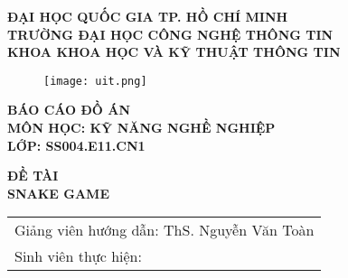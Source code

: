 \documentclass[a4paper, 12pt]{article}
\begin{document}

\thispagestyle{empty}
\begin{center}
    \begin{center}
        \textbf{ĐẠI HỌC QUỐC GIA TP. HỒ CHÍ MINH}\\[0.25cm]
        \large \textbf{TRƯỜNG ĐẠI HỌC CÔNG NGHỆ THÔNG TIN}\\[0.25cm]
        \large \textbf{KHOA KHOA HỌC VÀ KỸ THUẬT THÔNG TIN}
    \end{center}
    \vspace{1cm}

    \begin{figure}[h]
        \centering
        \texttt{[image: uit.png]} %
    \end{figure}
    \vspace{1cm}
    
    \begin{center}
        \Large \textbf{BÁO CÁO ĐỒ ÁN}\\[0.5cm]
        \Large \textbf{MÔN HỌC: KỸ NĂNG NGHỀ NGHIỆP}\\[0.25cm]
        \large \textbf{LỚP: SS004.E11.CN1}
    \end{center}
    \vspace{1cm}
    
    \begin{center}
        \Large \textbf{ĐỀ TÀI}\\[0.5cm]
        \huge \textbf{SNAKE GAME}
    \end{center}
    \vspace{1cm}
    
    \begin{table}[h]
        \centering
        \begin{tabular}{l c}
            \multicolumn{2}{l}{Giảng viên hướng dẫn: ThS. Nguyễn Văn Toàn} \\[0.5cm]
            \multicolumn{2}{l}{Sinh viên thực hiện:} \\[0.25cm]
    

\end{tabular}
\end{table}
\end{center}
\end{document}
